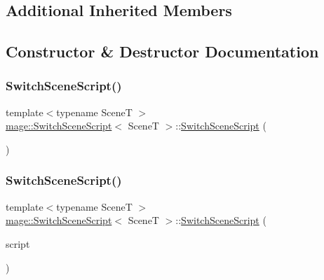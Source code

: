 \subsection*{Additional Inherited Members}


\subsection{Constructor \& Destructor Documentation}
\hypertarget{classmage_1_1_switch_scene_script_aefd104d1ddabdd4709c8682e89c79655}{}\label{classmage_1_1_switch_scene_script_aefd104d1ddabdd4709c8682e89c79655} 
\subsubsection{\texorpdfstring{Switch\+Scene\+Script()}{SwitchSceneScript()}\hspace{0.1cm}{\footnotesize\ttfamily [1/3]}}
{\footnotesize\ttfamily template$<$typename SceneT $>$ \\
\hyperlink{classmage_1_1_switch_scene_script}{mage\+::\+Switch\+Scene\+Script}$<$ SceneT $>$\+::\hyperlink{classmage_1_1_switch_scene_script}{Switch\+Scene\+Script} (\begin{DoxyParamCaption}{ }\end{DoxyParamCaption})\hspace{0.3cm}{\ttfamily [explicit]}}

\hypertarget{classmage_1_1_switch_scene_script_a307db08624888173ab256b387f07f1c4}{}\label{classmage_1_1_switch_scene_script_a307db08624888173ab256b387f07f1c4} 
\subsubsection{\texorpdfstring{Switch\+Scene\+Script()}{SwitchSceneScript()}\hspace{0.1cm}{\footnotesize\ttfamily [2/3]}}
{\footnotesize\ttfamily template$<$typename SceneT $>$ \\
\hyperlink{classmage_1_1_switch_scene_script}{mage\+::\+Switch\+Scene\+Script}$<$ SceneT $>$\+::\hyperlink{classmage_1_1_switch_scene_script}{Switch\+Scene\+Script} (\begin{DoxyParamCaption}\item[{const \hyperlink{classmage_1_1_switch_scene_script}{Switch\+Scene\+Script}$<$ SceneT $>$ \&}]{script }\end{DoxyParamCaption})\hspace{0.3cm}{\ttfamily [delete]}}

